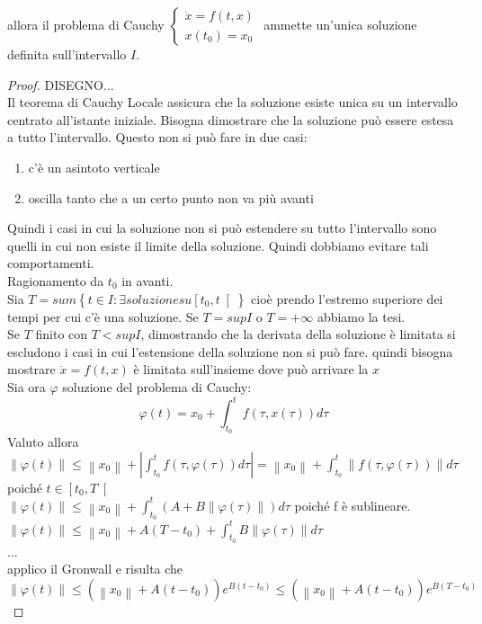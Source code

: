 allora il problema di Cauchy $\left\{\begin{matrix}\dot{x}=f(t,x)\\x(t_0)=x_0\end{matrix}\right.$ ammette un'unica soluzione definita sull'intervallo $I$.
\begin{proof}
	DISEGNO...\\
	Il teorema di Cauchy Locale assicura che  la soluzione esiste unica su un intervallo centrato all'istante iniziale.
	Bisogna dimostrare che la soluzione può essere estesa a tutto l'intervallo. Questo non si può fare in due casi:
	\begin{enumerate}
		\item c'è un asintoto verticale
		\item oscilla tanto che a un certo punto non va più avanti
	\end{enumerate}
	Quindi i casi in cui la soluzione non si può estendere su tutto l'intervallo sono quelli in cui non esiste il limite della soluzione. Quindi dobbiamo evitare tali comportamenti.\\
	Ragionamento da $t_0$ in avanti.\\
	Sia $T=sum\left\{t\in I :\exists soluzione su \left[ t_0,t \right[ \right\}$ cioè prendo l'estremo superiore dei tempi per cui c'è una soluzione.
	Se $T= sup I$ o $T=+\infty$ abbiamo la tesi.\\
	Se $T$ finito con $T<sup I$, dimostrando che la derivata della soluzione è limitata si escludono i casi in cui l'estensione della soluzione non si può fare.
	quindi bisogna mostrare $\dot{x} = f(t,x)$ è limitata sull'insieme dove può arrivare la $x$\\
	Sia ora $\varphi$ soluzione del problema di Cauchy:
	$$ \varphi(t) = x_0 + \int_{t_0}^tf(\tau,x(\tau))d\tau$$
	Valuto allora\\
	$\left\|\varphi(t)\right\|\le \left\|x_0\right\| + \left|\int_{t_0}^tf(\tau,\varphi(\tau))d\tau\right|=\left\|x_0\right\| + \int_{t_0}^t\left\|f(\tau,\varphi(\tau))\right\|d\tau$ poiché $t\in\left[t_0,T\right[$\\
	$\left\|\varphi(t)\right\|\le \left\|x_0\right\| + \int_{t_0}^t\left(A+B\left\|\varphi(\tau)\right\|\right)d\tau$ poiché f è sublineare.\\
	$\left\|\varphi(t)\right\|\le \left\|x_0\right\| + A(T-t_0)+\int_{t_0}^t B\left\|\varphi(\tau)\right\|d\tau$\\
	...\\
	applico il Gronwall e risulta che
	$$\left\|\varphi(t)\right\|\le\left(\left\|x_0\right\|+A(t-t_0)\right)e^{B(t-t_0)}\le\left(\left\|x_0\right\|+A(t-t_0)\right)e^{B(T-t_0)}$$	

\end{proof}
